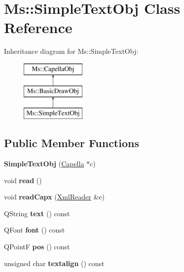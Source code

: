 \hypertarget{class_ms_1_1_simple_text_obj}{}\section{Ms\+:\+:Simple\+Text\+Obj Class Reference}
\label{class_ms_1_1_simple_text_obj}
Inheritance diagram for Ms\+:\+:Simple\+Text\+Obj\+:\begin{figure}[H]
\begin{center}
\leavevmode
\includegraphics[height=3.000000cm]{class_ms_1_1_simple_text_obj}
\end{center}
\end{figure}
\subsection*{Public Member Functions}
\begin{DoxyCompactItemize}
\item 
\mbox{\label{class_ms_1_1_simple_text_obj_ab78df232947c3d3f8227b53326cf3393}} 
{\bfseries Simple\+Text\+Obj} (\hyperlink{class_ms_1_1_capella}{Capella} $\ast$c)
\item 
\mbox{\label{class_ms_1_1_simple_text_obj_a2e6997b6e781b43c02abf743454f2fac}} 
void {\bfseries read} ()
\item 
\mbox{\label{class_ms_1_1_simple_text_obj_aa9985ee24c3f5166f4b188e208ea96a6}} 
void {\bfseries read\+Capx} (\hyperlink{class_ms_1_1_xml_reader}{Xml\+Reader} \&e)
\item 
\mbox{\label{class_ms_1_1_simple_text_obj_abfae4a80ee7fee29c133cd982c8f603a}} 
Q\+String {\bfseries text} () const
\item 
\mbox{\label{class_ms_1_1_simple_text_obj_aadd02515d2965d371becea4a7bd476cf}} 
Q\+Font {\bfseries font} () const
\item 
\mbox{\label{class_ms_1_1_simple_text_obj_abc9d2218a1a67fdbe5ead994c732ee52}} 
Q\+PointF {\bfseries pos} () const
\item 
\mbox{\label{class_ms_1_1_simple_text_obj_a8a16a73ef51db753e2637f1ce9edd407}} 
unsigned char {\bfseries textalign} () const
\end{DoxyCompactItemize}
